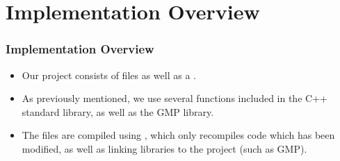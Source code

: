 \section{Implementation Overview}



\begin{frame}
\frametitle{Implementation Overview}
\begin{itemize}
\item Our project consists of  files as well
  as a .
\item As previously mentioned, we use several functions
  included in the C++ standard library, as well as the GMP
  library.
\item The  files are compiled using
  , which only recompiles code which has been
  modified, as well as linking libraries to the project
  (such as GMP).
\end{itemize}
\end{frame}
